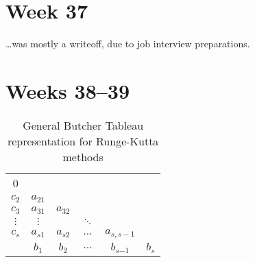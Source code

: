 \section{Week 37}
\label{sec:37}

\ldots was mostly a writeoff, due to job interview preparations.

\section{Weeks 38--39}

\begin{table}[h]
    \caption{General Butcher Tableau representation for Runge-Kutta methods}
    \label{tab:general_butcher_tableau}
    \centering
    \begin{tabular}{c|ccccc}
        0 \\
        $c_{\scriptscriptstyle 2}$ & $a_{\scriptscriptstyle 21}$ \\
        $c_{\scriptscriptstyle 3}$ & $a_{\scriptscriptstyle 31}$ & $a_{\scriptscriptstyle 32}$ \\
        $\vdots$ & $\vdots$ & & $\ddots$ \\
        $c_{s}$ & $a_{s1}$ & $a_{s \scriptscriptstyle 2}$ & $\ldots$ & $a_{s,s \scriptscriptstyle -1}$ \\
        \hline
        & $b_{\scriptscriptstyle 1}$ & $b_{\scriptscriptstyle 2}$ & $\ldots$ & $b_{s \scriptscriptstyle{-1}}$ & $b_{s}$
    \end{tabular}
\end{table}

